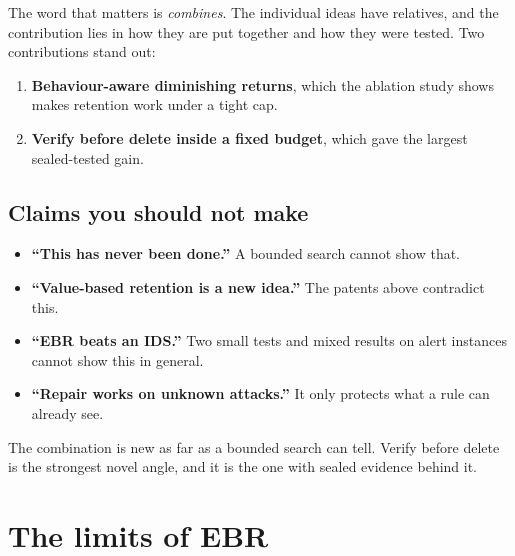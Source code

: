 The word that matters is \emph{combines}. The individual ideas have relatives, and the contribution lies in how they are put together and how they were tested. Two contributions stand out:
\begin{enumerate}
\item \textbf{Behaviour-aware diminishing returns}, which the ablation study shows makes retention work under a tight cap.
\item \textbf{Verify before delete inside a fixed budget}, which gave the largest sealed-tested gain.
\end{enumerate}

\section{Claims you should not make}
\begin{careful}
\begin{itemize}
\item \textbf{``This has never been done.''} A bounded search cannot show that.
\item \textbf{``Value-based retention is a new idea.''} The patents above contradict this.
\item \textbf{``EBR beats an IDS.''} Two small tests and mixed results on alert instances cannot show this in general.
\item \textbf{``Repair works on unknown attacks.''} It only protects what a rule can already see.
\end{itemize}
\end{careful}

\begin{recap}
The combination is new as far as a bounded search can tell. Verify before delete is the strongest novel angle, and it is the one with sealed evidence behind it.
\end{recap}

\chapter{The limits of EBR}

